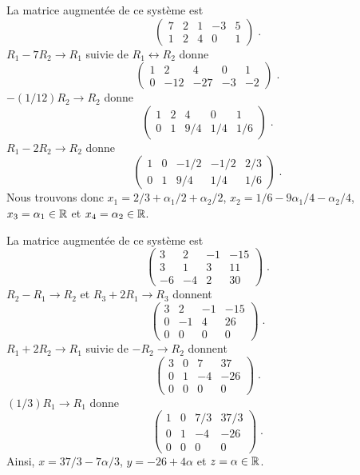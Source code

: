 {
La matrice augmentée de ce système est
\[
\left(\begin{array}{rrrr|r}
7 & 2 & 1 & -3 & 5 \\ 1 & 2 & 4 & 0 & 1
\end{array}\right) \; .
\]
$R_1 -7 R_2 \to R_1$ suivie de $R_1 \leftrightarrow R_2$ donne
\[
\left(\begin{array}{rrrr|r}
1 & 2 & 4 & 0 & 1 \\  0 & -12 & -27 & -3 & -2
\end{array}\right) \; .
\]
$-(1/12) R_2 \to R_2$ donne
\[
\left(\begin{array}{rrrr|r}
1 & 2 & 4 & 0 & 1 \\ 0 & 1 & 9/4 & 1/4 & 1/6
\end{array}\right) \; .
\]
$R_1 - 2R_2 \to R_2$ donne
\[
\left(\begin{array}{rrrr|r}
1 & 0 & -1/2 & -1/2 & 2/3 \\ 0 & 1 & 9/4 & 1/4 & 1/6
\end{array}\right) \; .
\]
Nous trouvons donc $x_1= 2/3 + \alpha_1/2 + \alpha_2/2$,
$x_2 = 1/6 - 9\alpha_1/4 - \alpha_2/4$, $x_3 = \alpha_1 \in \mathbb{R}$ et
$x_4 = \alpha_2 \in \mathbb{R}$.

La matrice augmentée de ce système est
\[
\left(\begin{array}{rrr|r}
3 & 2 & -1 & -15 \\ 3 & 1 & 3 & 11 \\ -6 & -4 & 2 & 30
\end{array}\right) \; .
\]
$R_2 - R_1 \to R_2$ et $R_3 + 2R_1 \to R_3$ donnent
\[
\left(\begin{array}{rrr|r}
3 & 2 & -1 & -15 \\ 0 & -1 & 4 & 26 \\ 0 & 0 & 0 & 0
\end{array}\right) \; .
\]
$R_1 + 2R_2 \to R_1$ suivie de $-R_2 \to R_2$ donnent
\[
\left(\begin{array}{rrr|r}
3 & 0 & 7 & 37 \\ 0 & 1 & -4 & -26 \\ 0 & 0 & 0 & 0
\end{array}\right) \; .
\]
$(1/3) R_1 \to R_1$ donne
\[
\left(\begin{array}{rrr|r}
1 & 0 & 7/3 & 37/3 \\ 0 & 1 & -4 & -26 \\ 0 & 0 & 0 & 0
\end{array}\right) \; .
\]
Ainsi, $x=37/3 - 7\alpha/3$, $y=-26 + 4 \alpha$ et $z = \alpha\in \mathbb{R}$.
}

